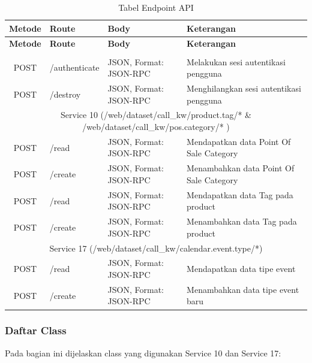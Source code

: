 \begingroup
\setlength{\tabcolsep}{6pt}
\begin{small}
	\begin{longtable}{|c|p{3cm}|p{3cm}|p{6cm}|}
		\caption{Tabel Endpoint API} \label{tab:endpoint-api} \\
	\hline
		\textbf{Metode} & \textbf{Route} & \textbf{Body} & \textbf{Keterangan} \\
	\hline
	\endfirsthead
	\hline
	\textbf{Metode} & \textbf{Route} & \textbf{Body} & \textbf{Keterangan} \\
	\hline
	\endhead
	\hline
	\endfoot
	\hline
	\endlastfoot
	
	\multicolumn{4}{|c|}{Monolith (/web/session/*)} \\
	\hline
	POST & /authenticate & JSON, Format: JSON-RPC & Melakukan sesi autentikasi pengguna \\
	\hline
	POST & /destroy & JSON, Format: JSON-RPC & Menghilangkan sesi autentikasi pengguna \\
	\hline
	
	\multicolumn{4}{|c|}{Service 10 (/web/dataset/call\_kw/product.tag/*  \& /web/dataset/call\_kw/pos.category/* )} \\
	\hline
	POST & /read & JSON, Format: JSON-RPC & Mendapatkan data Point Of Sale Category \\
	\hline
	POST & /create & JSON, Format: JSON-RPC & Menambahkan data Point Of Sale Category \\
	\hline
	POST & /read & JSON, Format: JSON-RPC & Mendapatkan data Tag pada product\\
	\hline
	POST & /create & JSON, Format: JSON-RPC & Menambahkan data Tag pada product \\
	\hline
	
	\multicolumn{4}{|c|}{Service 17 (/web/dataset/call\_kw/calendar.event.type/*)} \\
	\hline
	POST & /read & JSON, Format: JSON-RPC & Mendapatkan data tipe event\\
	\hline
	POST & /create & JSON, Format: JSON-RPC & Menambahkan  data tipe event baru\\
	\hline
	
	\end{longtable}
	\end{small}
\endgroup

\subsubsection{Daftar Class}
Pada bagian ini dijelaskan class yang digunakan Service 10 dan Service 17:

